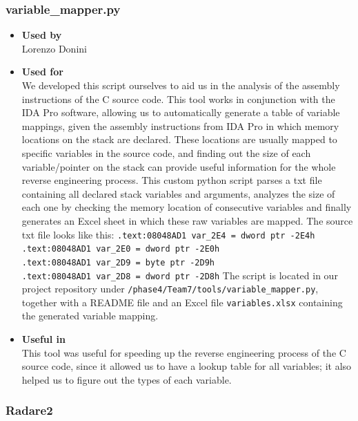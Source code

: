 \subsubsection*{variable\_mapper.py}
\begin{itemize}
	\item \textbf{Used by}\\ Lorenzo Donini
	\item \textbf{Used for}\\ We developed this script ourselves to aid us in the analysis of the assembly instructions of the C source code. 
	This tool works in conjunction with the IDA Pro software, allowing us to automatically generate a table of variable mappings, given the assembly instructions from IDA Pro in which memory locations on the stack are declared. These locations are usually mapped to specific variables in the source code, and finding out the size of each variable/pointer on the stack can provide useful information for the whole reverse engineering process.\newline
	This custom python script parses a txt file containing all declared stack variables and arguments, analyzes the size of each one by checking the memory location of consecutive variables and finally generates an Excel sheet in which these raw variables are mapped.\newline
	The source txt file looks like this:\newline
	\texttt{.text:08048AD1 var\_2E4         = dword ptr -2E4h \\
		.text:08048AD1 var\_2E0         = dword ptr -2E0h \\
		.text:08048AD1 var\_2D9         = byte ptr -2D9h \\
		.text:08048AD1 var\_2D8         = dword ptr -2D8h}\newline
	The script is located in our project repository under \texttt{/phase4/Team7/tools/variable\_mapper.py}, together with a README file and an Excel file \texttt{variables.xlsx} containing the generated variable mapping.
	
	\item \textbf{Useful in}\\ This tool was useful for speeding up the reverse engineering process of the C source code, since it allowed us to have a lookup table for all variables; it also helped us to figure out the types of each variable.
\end{itemize}

\subsubsection*{Radare2}

